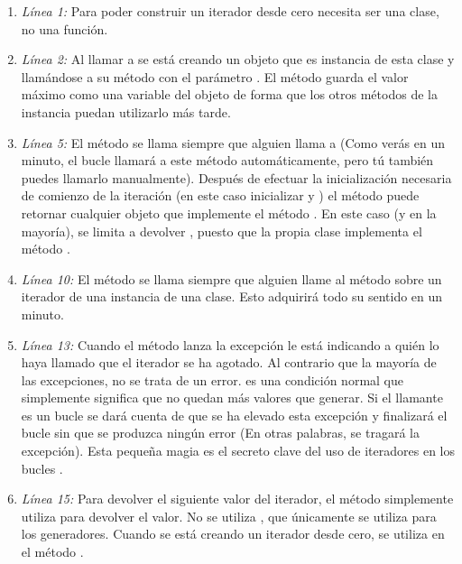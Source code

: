 \begin{enumerate}

\item \emph{Línea 1:} Para poder construir un iterador desde cero  necesita ser una clase, no una función.

\item \emph{Línea 2:} Al llamar a  se está creando un objeto que es instancia de esta clase y llamándose a su método  con el parámetro . El método  guarda el valor máximo como una variable del objeto de forma que los otros métodos de la instancia puedan utilizarlo más tarde.

\item \emph{Línea 5:} El método  se llama siempre que alguien llama a  (Como verás en un minuto, el bucle  llamará a este método automáticamente, pero tú también puedes llamarlo manualmente). Después de efectuar la inicialización necesaria de comienzo de la iteración (en este caso inicializar  y ) el método  puede retornar cualquier objeto que implemente el método . En este caso (y en la mayoría),  se limita a devolver , puesto que la propia clase implementa el método .

\item \emph{Línea 10:} El método  se llama siempre que alguien llame al método  sobre un iterador de una instancia de una clase. Esto adquirirá todo su sentido en un minuto.

\item \emph{Línea 13:} Cuando el método  lanza la excepción  le está indicando a quién lo haya llamado que el iterador se ha agotado. Al contrario que la mayoría de las excepciones, no se trata de un error. es una condición normal que simplemente significa que no quedan más valores que generar. Si el llamante es un bucle  se dará cuenta de que se ha elevado esta excepción y finalizará el bucle sin que se produzca ningún error (En otras palabras, se tragará la excepción). Esta pequeña magia es el secreto clave del uso de iteradores en los bucles .

\item \emph{Línea 15:} Para devolver el siguiente valor del iterador, el método  simplemente utiliza  para devolver el valor. No se utiliza , que únicamente se utiliza para los generadores. Cuando se está creando un iterador desde cero, se utiliza  en el método .

\end{enumerate}

